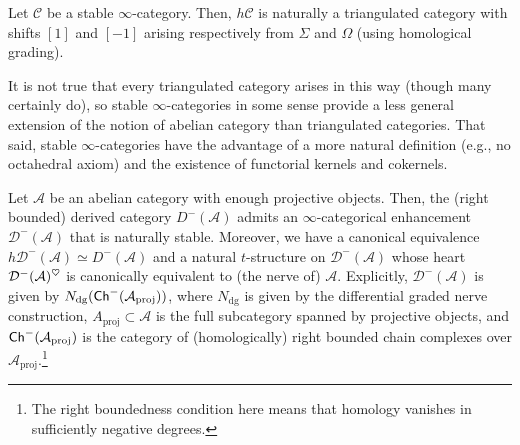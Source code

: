 \documentclass[11pt]{article}
\renewcommand{\A}{\mathcal{A}}
\renewcommand{\C}{\mathscr{C}}
\newcommand{\D}{\mathcal{D}}
\DeclareMathOperator{\dg}{dg} %
\DeclareMathOperator{\proj}{proj} %
\begin{document}
\begin{proposition}
Let $\C$ be a stable $\infty$-category. Then, $h\C$ is naturally a triangulated category with shifts $[1]$ and $[-1]$ arising respectively from $\Sigma$ and $\Omega$ (using homological grading).
\end{proposition}

\begin{remark}
It is not true that every triangulated category arises in this way (though many certainly do), so stable $\infty$-categories in some sense provide a less general extension of the notion of abelian category than triangulated categories. That said, stable $\infty$-categories have the advantage of a more natural definition (e.g., no octahedral axiom) and the existence of functorial kernels and cokernels.
\end{remark}

\begin{example}
Let $\A$ be an abelian category with enough projective objects. Then, the (right bounded) derived category $D^-(\A)$ admits an $\infty$-categorical enhancement $\D^-(\A)$ that is naturally stable. Moreover, we have a canonical equivalence $h\D^-(\A)\simeq D^-(\A)$ and a natural $t$-structure on $\D^-(\A)$ whose heart $\D^-(\A)^{\heart}$ is canonically equivalent to (the nerve of) $\A$. Explicitly, $\D^-(\A)$ is given by $N_{\dg}(\Ch^-(\A_{\proj}))$, where $N_{\dg}$ is given by the differential graded nerve construction, $A_{\proj}\subset\A$ is the full subcategory spanned by projective objects, and $\Ch^-(\A_{\proj})$ is the category of (homologically) right bounded chain complexes over $\A_{\proj}$.\footnote{The right boundedness condition here means that homology vanishes in sufficiently negative degrees.}
\end{example}
\end{document}
